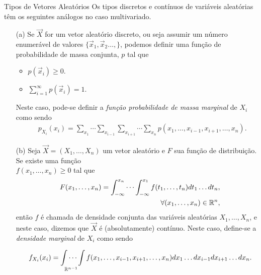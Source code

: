 \begin{frame}
\frametitle{}
\begin{block}{Tipos de Vetores Aleatórios}
Os tipos discretos e contínuos de variáveis aleatórias têm os seguintes análogos no caso multivariado.
\begin{enumerate}
\item[(a)] Se $\vec{X}$ for um vetor aleatório discreto, ou seja assumir um
número enumerável de valores $\{\vec{x}_1,\vec{x}_2\ldots,\}$,
podemos definir uma função de probabilidade de massa conjunta, $p$
tal que
\begin{itemize}
\item $p(\vec{x}_i)\geq 0$.
\item $\sum_{i=1}^{\infty}p(\vec{x}_i)=1$.
\end{itemize}
Neste caso, pode-se definir a {\em função probabilidade de massa marginal} de $X_i$ como sendo
\begin{eqnarray}
& & p_{X_i}(x_i)= \sum_{x_1}\cdots\sum_{x_{i-1}}\sum_{x_{i+1}}\cdots\sum_{x_n}p(x_1,\ldots,x_{i-1},x_{i+1},\ldots,x_n).\nonumber
\end{eqnarray}
\end{enumerate}
\end{block}
\end{frame}

\begin{frame}
\begin{block}{}

\begin{enumerate}
\item[(b)] Seja $\vec{X}=(X_1,\ldots,X_n)$ um vetor aleatório e $F$ sua função de distribuição. Se existe uma função\\
$f(x_1,\ldots,x_n)\geq 0$ tal que
\begin{eqnarray}
& & F(x_1,\ldots,x_n)=\int_{-\infty}^{x_n}\cdots\int_{-\infty}^{x_1}f(t_1,\ldots,t_n)dt_1\ldots dt_n, \nonumber\\
& &\forall(x_1,\ldots,x_n)\in \mathbb{R}^n,\nonumber
\end{eqnarray}
então $f$ é chamada de densidade conjunta das variáveis aleatórias $X_1,\ldots,X_n$, e neste caso, dizemos que $\vec{X}$ é (absolutamente) contínuo. Neste caso, define-se a {\em densidade marginal} de $X_i$ como sendo

\begin{eqnarray}
& & f_{X_i}(x_i)=\idotsint\limits_{\mathbb{R}^{n-1}} f(x_1,\ldots,x_{i-1},x_{i+1},\ldots,x_n)dx_1\ldots
dx_{i-1}dx_{i+1}\ldots dx_n. \nonumber
\end{eqnarray}
\end{enumerate}

\end{block}
\end{frame}




